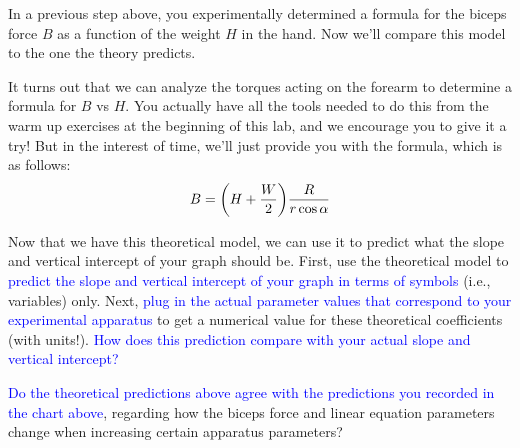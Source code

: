 \documentclass[11pt,letterpaper]{article}
\newcommand{\question}[2][blue]{\textcolor{#1}{#2}}
\newcommand{\yint}[1][]{vertical intercept\xspace}
\begin{document}
In a previous step above,
you experimentally determined a formula for the biceps force $B$ as a function
of the weight $H$ in the hand.  
Now we'll compare this model to the one the theory predicts.

It turns out that we can analyze the torques acting on the forearm
to determine a formula for $B$ vs $H$.  You actually have all the tools needed
to do this from the warm up exercises at the beginning of this lab, and we
encourage you to give it a try!  But in the interest of time, we'll just
provide you with the formula, which is as follows:
\begin{equation*}
	B = {\left(  H + \frac{W}{2}  \right)}\frac{R}{r\cos\alpha}
\end{equation*}

\begin{comment}
{{{
Given this theoretical model, 
can you determine what the theory predicts the coefficients appearing in
your formula for $B$ vs $H$ should be?  
Hopefully, you noticed your data plot of $B$ vs $H$ was linear.
It turns out, we can use the theoretical model to predict what the slope and
\yint  of that graph should be.
\question{First write your answer in terms of symbols} 
(i.e., variables) only;
\question{then, plug in the values for those variables} 
according to your apparatus, 
to determine the theoretical model coefficients.
How do these theoretical coefficients compare to your experimental model
coefficients?  
(\question{Calculate the percent difference} 
and \question{comment on how well they agree}.)

You just used a theoretical model to predict the values of your experimental
model coefficients.
Now, we'll look at the predictions the theoretical model makes on your data
itself.  
(This may seem similar to the previous step,
but there's actually a subtle difference.)
}}}
\end{comment}

Now that we have this theoretical model, 
we can use it to predict what the slope and \yint of your graph should be.
First, use the theoretical model to 
\question{predict the slope and \yint  
of your graph in terms of symbols} (i.e., variables) only.
Next, \question{plug in the actual parameter values 
that correspond to your experimental apparatus}
to get a numerical value for these theoretical coefficients (with units!).
\question{How does this prediction compare 
with your actual slope and \yint ?}

\question{Do the theoretical predictions above agree 
with the predictions you recorded in the chart above},
regarding how the biceps force and linear equation parameters change when
increasing certain apparatus parameters?
\end{document}
